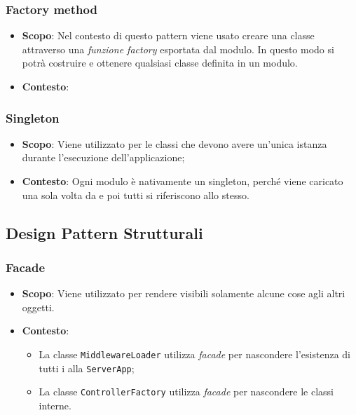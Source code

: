 \subsubsection{Factory method}

\begin{itemize}

	\item \textbf{Scopo}: Nel contesto di  questo pattern viene usato creare una classe attraverso una \textit{funzione factory} esportata dal modulo. In questo modo si potrà costruire e ottenere qualsiasi classe definita in un modulo.
	\item \textbf{Contesto}: 

\end{itemize}

\subsubsection{Singleton}

\begin{itemize}

	\item \textbf{Scopo}: Viene utilizzato per le classi che devono avere un'unica istanza durante l'esecuzione dell'applicazione;
	\item \textbf{Contesto}: Ogni modulo è nativamente un singleton, perché viene caricato una sola volta da  e poi tutti si riferiscono allo stesso.

\end{itemize}

\subsection{Design Pattern Strutturali}

\subsubsection{Facade}

\begin{itemize}

	\item \textbf{Scopo}: Viene utilizzato per rendere visibili solamente alcune cose agli altri oggetti.
	\item \textbf{Contesto}: 
	\begin{itemize}
	
		\item La classe \texttt{MiddlewareLoader} utilizza \textit{facade} per nascondere l'esistenza di tutti i  alla \texttt{ServerApp};
		\item La classe \texttt{ControllerFactory} utilizza \textit{facade} per nascondere le classi interne.
		
	\end{itemize}
\end{itemize}

